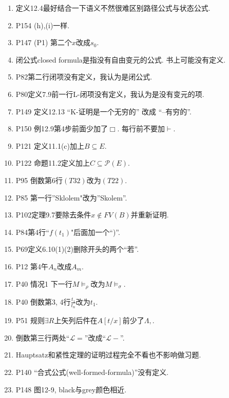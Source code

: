 \documentclass{article}
\begin{document}
\begin{enumerate}
\item 定义12.4最好结合一下语义不然很难区别路径公式与状态公式. 
\item P154 (h),(i)一样. 
\item P147 (P1) 第二个$x$改成$s_0$. 
\item 闭公式closed formula是指没有自由变元的公式. 书上可能没有定义. 
\item P82第二行闭项没有定义，我认为是闭公式. 
\item P80定义7.9前一行L-闭项没有定义，我认为是没有变元的项. 
\item P149 定义12.13 ``K-证明是一个无穷的'' 改成 ``--有穷的''. 
\item P150 例12.9第4步前面少加了$\Box$. 每行前不要加$\vdash$. 
\item P121 定义11.1(c)加上$B\subseteq E$. 
\item P122 命题11.2定义加上$C\subseteq \mathcal{P}(E)$. 
\item P95 倒数第6行$(T32)$改为$(T22)$. 
\item P85 第一行''Sklolem"改为''Skolem''. 
\item P102定理9.7要除去条件$x\notin FV(B)$并重新证明. 
\item P84第4行``$f(t_1)$"后面加一个``)''. 
\item P69定义6.10(1)(2)删除开头的两个``若''. 
\item P12 第4午$A_n$改成$A_m$. 
\item P40 情况1 下一行$M\models_\rho$改为$M\models_\sigma$. 
\item P40 倒数第3, 4行$\frac{t_1}{t_n}$改为$t_1$. 
\item P51 规则$\exists R$上矢列后件在$A[t/x]$前少了$\Lambda, $. 
\item 倒数第三行两处``$\mathscr{L}=$''改成``$\mathscr{L}-$''. 
\item Hauptsatz和紧性定理的证明过程完全不看也不影响做习题. 
\item P140 ``合式公式(well-formed-formula)''没有定义. 
\item P148 图12-9, black与grey颜色相近. 
\end{enumerate}
\end{document}
